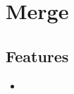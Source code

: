 \section{Merge}
\label{module:Merge}

\subsection{Features}
\begin{itemize}
	\item {}
\end{itemize}
\TODO